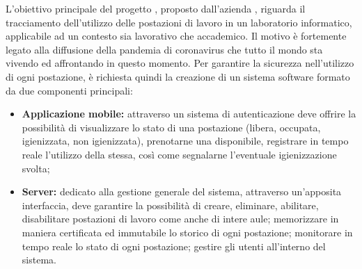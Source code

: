 L'obiettivo principale del progetto \NomeProgetto{}, proposto dall'azienda \proponente{}, riguarda il tracciamento dell'utilizzo delle postazioni di lavoro in un laboratorio informatico, applicabile ad un contesto sia lavorativo che accademico.
Il motivo è fortemente legato alla diffusione della pandemia di coronavirus che tutto il mondo sta vivendo ed affrontando in questo momento. Per garantire la sicurezza nell'utilizzo di ogni postazione, è richiesta quindi la creazione di un sistema software formato da due componenti principali:
\begin{itemize}
    \item \textbf{Applicazione mobile:} attraverso un sistema di autenticazione deve offrire la possibilità di visualizzare lo stato di una postazione (libera, occupata, igienizzata, non igienizzata), prenotarne una disponibile, registrare in tempo reale l'utilizzo della stessa, così come segnalarne l'eventuale igienizzazione svolta;
    \item \textbf{Server:} dedicato alla gestione generale del sistema, attraverso un'apposita interfaccia, deve garantire la possibilità di creare, eliminare, abilitare, disabilitare postazioni di lavoro come anche di intere aule; memorizzare in maniera certificata ed immutabile lo storico di ogni postazione; monitorare in tempo reale lo stato di ogni postazione; gestire gli utenti all'interno del sistema.
\end{itemize}